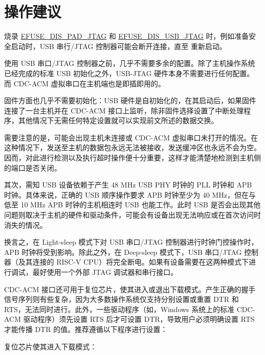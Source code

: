\documentclass[main\_\_CN.tex]{subfiles}
\begin{document}
\section{操作建议}
\label{sec:usbserialjtag-recommended-operation}

\vspace{1em}
\begin{tiplisting}
烧录 \hyperref[fielddesc:EFUSEDISPADJTAG]{EFUSE\_DIS\_PAD\_JTAG} 和 \hyperref[fielddesc:EFUSEDISUSBJTAG]{EFUSE\_DIS\_USB\_JTAG} 时，例如准备安全启动时，USB 串行/JTAG 控制器可能会断开连接，直至 \chipname{} 重新启动。
\end{tiplisting}

使用 USB 串口/JTAG 控制器之前，几乎不需要多余的配置。除了主机操作系统已经完成的标准 USB 初始化之外，USB-JTAG 硬件本身不需要进行任何配置。而 CDC-ACM 虚拟串口在主机端也是即插即用的。

固件方面也几乎不需要初始化：USB 硬件是自初始化的，在其启动后，如果固件连接了一台主机并在 CDC-ACM 接口上监听，除非固件选择设置了中断处理程序，其他情况下无需任何特定设置就可以实现前文所述的数据交换。

需要注意的是，可能会出现主机未连接或 CDC-ACM 虚拟串口未打开的情况。在这种情况下，发送至主机的数据包永远无法被接收，发送缓冲区也永远不会为空。因而，对此进行检测以及执行超时操作便十分重要，这样才能清楚地检测到主机侧的端口是否关闭。

其次，需知 USB 设备依赖于产生 48 MHz USB PHY 时钟的 PLL 时钟和 APB 时钟。具体来说，正确的 USB 顺序操作要求 APB 时钟至少为 40 MHz，但在与低至 10 MHz APB 时钟的主机相连时 USB 也能工作。此时 USB 是否会出现其他问题则取决于主机的硬件和驱动条件，可能会有设备出现无法响应或在首次访问时消失的情况。

换言之，在 Light-sleep 模式下对 USB 串口/JTAG 控制器进行时钟门控操作时，APB 时钟将受到影响。除此之外，在 Deep-sleep 模式下，USB 串口/JTAG 控制器（及其连接的 RISC-V CPU）将完全断电。如果有设备需要在这两种模式下进行调试，最好使用一个外部 JTAG 调试器和串行接口。

CDC-ACM 接口还可用于复位芯片，使其进入或退出下载模式。产生正确的握手信号序列则有些复杂，因为大多数操作系统仅支持分别设置或重置 DTR 和 RTS，无法同时进行。此外，一些驱动程序（如，Windows 系统上的标准 CDC-ACM 驱动程序）须先设置 RTS 后才可设置 DTR，导致用户必须明确设置 RTS 才能传播 DTR 的值。推荐遵循以下程序进行设置：

复位芯片使其进入下载模式：
\end{document}
